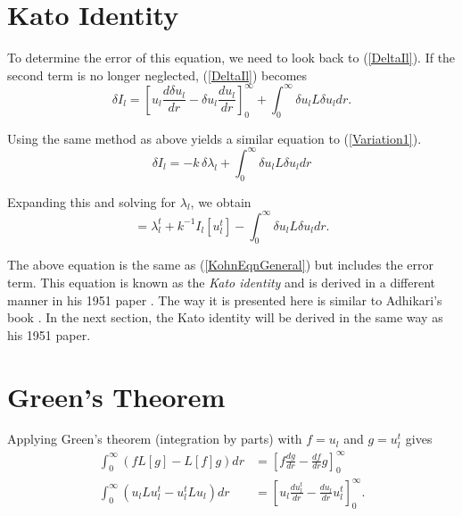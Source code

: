 \documentclass[Dissertation.tex]{subfiles}
\begin{document}
\section{Kato Identity}
To determine the error of this equation, we need to look back to (\ref{DeltaIl}).  If the second term is no longer neglected, (\ref{DeltaIl}) becomes
\begin{equation}
\delta I_l = \left[u_l \frac{d\delta u_l}{dr} - \delta u_l \frac{du_l}{dr} \right]_0^\infty + \int_0^\infty \delta u_l L \delta u_l dr.
\end{equation}

\noindent Using the same method as above yields a similar equation to (\ref{Variation1}).
\begin{equation}
\delta I_l = -k\, \delta\!\lambda_l + \int_0^\infty \delta u_l L \delta u_l dr
\end{equation}

\noindent Expanding this and solving for $\lambda_l$, we obtain
\begin{equation}
[\lambda_l] = \lambda_l^t + k^{-1} I_l[u_l^t] - \int_0^\infty \delta u_l L \delta u_l dr.
\label{Kato1}
\end{equation}

The above equation is the same as (\ref{KohnEqnGeneral}) but includes the error term.  This equation is known as the \emph{Kato identity} and is derived in a different manner in his 1951 paper \cite{Kato1951a}.  The way it is presented here is similar to Adhikari's book \cite{Adhikari1998}.  In the next section, the Kato identity will be derived in the same way as his 1951 paper.


\section{Green's Theorem}
Applying Green's theorem (integration by parts) with $f = u_l$ and $g = u_l^t$ gives \cite{Kato1951a}
\begin{align}
\nonumber \int_0^\infty(f L[g] - L[f] g)dr &= \left[f \frac{dg}{dr} - \frac{df}{dr} g\right]_0^\infty \\
\int_0^\infty(u_l L u_l^t - u_l^t L u_l)dr &= \left[u_l \frac{du_l^t}{dr} - \frac{du_l}{dr} u_l^t\right]_0^\infty.
\label{GreenTheorem}
\end{align}
\end{document}
